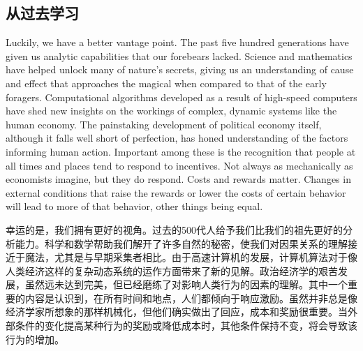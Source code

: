 \subsection{从过去学习}
\begin{paracol}{2}
Luckily, we have a better vantage point. The past five hundred generations have given us analytic capabilities that our forebears lacked. Science and mathematics have helped unlock many of nature's secrets, giving us an understanding of cause and effect that approaches the magical when compared to that of the early foragers. Computational algorithms developed as a result of high-speed computers have shed new insights on the workings of complex, dynamic systems like the human economy. The painstaking development of political economy itself, although it falls well short of perfection, has honed understanding of the factors informing human action. Important among these is the recognition that people at all times and places tend to respond to incentives. Not always as mechanically as economists imagine, but they do respond. Costs and rewards matter. Changes in external conditions that raise the rewards or lower the costs of certain behavior will lead to more of that behavior, other things being equal.

\switchcolumn
幸运的是，我们拥有更好的视角。过去的500代人给予我们比我们的祖先更好的分析能力。科学和数学帮助我们解开了许多自然的秘密，使我们对因果关系的理解接近于魔法，尤其是与早期采集者相比。由于高速计算机的发展，计算机算法对于像人类经济这样的复杂动态系统的运作方面带来了新的见解。政治经济学的艰苦发展，虽然远未达到完美，但已经磨练了对影响人类行为的因素的理解。其中一个重要的内容是认识到，在所有时间和地点，人们都倾向于响应激励。虽然并非总是像经济学家所想象的那样机械化，但他们确实做出了回应，成本和奖励很重要。当外部条件的变化提高某种行为的奖励或降低成本时，其他条件保持不变，将会导致该行为的增加。

\end{paracol}


